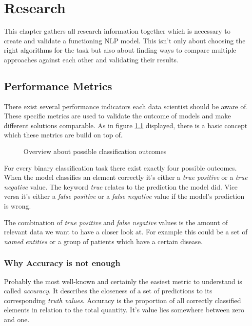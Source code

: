 \chapter{Research}

This chapter gathers all research information together which is necessary to create and validate a functioning NLP model. This
isn't only about choosing the right algorithms for the task but also about finding ways to compare multiple approaches against
each other and validating their results.

\section{Performance Metrics}
\label{chap:formulas}
There exist several performance indicators each data scientist should be aware of. These specific metrics are used to validate
the outcome of models and make different solutions comparable. As in figure \ref{fig:metrics} displayed, there is a basic
concept which these metrics are build on top of.

\begin{figure}[!ht]
\centering
{}
\caption{Overview about possible classification outcomes\cite{wiki01}}
\label{fig:metrics}
\end{figure}

For every binary classification task there exist exactly four possible outcomes. When the model classifies an element correctly it's
either a \emph{true positive} or a \emph{true negative} value. The keyword \emph{true} relates to the prediction the model did.
Vice versa it's either a \emph{false positive} or a \emph{false negative} value if the model's prediction is wrong.

The combination of \emph{true positive} and \emph{false negative} values is the amount of relevant data we want to have a closer
look at. For example this could be a set of \emph{named entities} or a group of patients which have a certain disease.

\subsection{Why Accuracy is not enough}
\label{chap:accuracy}
Probably the most well-known and certainly the easiest metric to understand is called \emph{accuracy}. It describes the
closeness of a set of predictions to its corresponding \emph{truth values}. Accuracy is the proportion of all correctly classified
elements in relation to the total quantity. It's value lies somewhere between zero and one.

